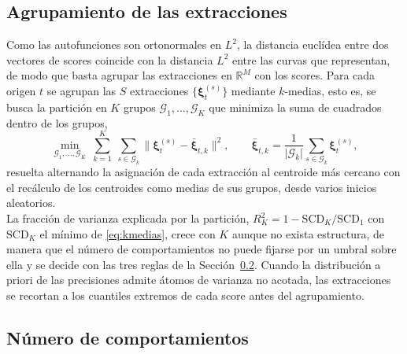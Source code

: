 \subsection{Agrupamiento de las extracciones}
\label{03_06_01_agrupamiento}

Como las autofunciones son ortonormales en $L^2$, la distancia euclídea entre dos vectores de scores coincide con la distancia $L^2$ entre las curvas que representan, de modo que basta agrupar las extracciones en $\mathbb{R}^{M}$ con los scores. Para cada origen $t$ se agrupan las $S$ extracciones $\{\boldsymbol{\xi}_t^{(s)}\}$ mediante $k$-medias, esto es, se busca la partición en $K$ grupos $\mathcal{G}_1, \dots, \mathcal{G}_K$ que minimiza la suma de cuadrados dentro de los grupos,
\begin{equation}\label{eq:kmedias}
    \min_{\mathcal{G}_1, \dots, \mathcal{G}_K}\ \sum_{k=1}^{K}\ \sum_{s \in \mathcal{G}_k} \bigl\lVert \boldsymbol{\xi}_t^{(s)} - \bar{\boldsymbol{\xi}}_{t,k} \bigr\rVert^{2},
    \qquad
    \bar{\boldsymbol{\xi}}_{t,k} = \frac{1}{\lvert \mathcal{G}_k \rvert}\sum_{s \in \mathcal{G}_k} \boldsymbol{\xi}_t^{(s)},
\end{equation}
resuelta alternando la asignación de cada extracción al centroide más cercano con el recálculo de los centroides como medias de sus grupos, desde varios inicios aleatorios.\\

La fracción de varianza explicada por la partición, $R^2_K = 1 - \mathrm{SCD}_K / \mathrm{SCD}_1$ con $\mathrm{SCD}_K$ el mínimo de \eqref{eq:kmedias}, crece con $K$ aunque no exista estructura, de manera que el número de comportamientos no puede fijarse por un umbral sobre ella y se decide con las tres reglas de la Sección~\ref{03_06_02_numero}. Cuando la distribución a priori de las precisiones admite átomos de varianza no acotada, las extracciones se recortan a los cuantiles extremos de cada score antes del agrupamiento.

\subsection{Número de comportamientos}
\label{03_06_02_numero}

